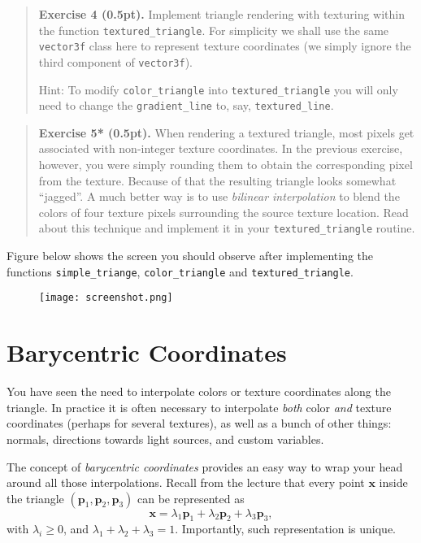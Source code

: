 \documentclass{article}
\newenvironment{exercise}[2]{\begin{verse}\textbf{Exercise #1 (#2pt).} }{
\end{verse}\medskip}
\newcommand{\bx}{\mathbf{x}}
\newcommand{\bp}{\mathbf{p}}
\begin{document}
\begin{exercise}{4}{0.5}
Implement triangle rendering with texturing within the function \verb#textured_triangle#. For simplicity we shall use the same \texttt{vector3f} class here to represent texture coordinates (we simply ignore the third component of \texttt{vector3f}).

Hint: To modify \verb#color_triangle# into \verb#textured_triangle# you will only need to change the \verb#gradient_line# to, say, \verb#textured_line#.
\end{exercise}

\begin{exercise}{5*}{0.5}
When rendering a textured triangle, most pixels get associated with non-integer texture coordinates. In the previous exercise, however, you were simply rounding them to obtain the corresponding pixel from the texture. Because of that the resulting triangle looks somewhat ``jagged''. A much better way is to use \emph{bilinear interpolation} to blend the colors of four texture pixels surrounding the source texture location. Read about this technique and implement it in your \verb#textured_triangle# routine.
\end{exercise}

Figure below shows the screen you should observe after implementing the functions \verb#simple_triange#, \verb#color_triangle# and \verb#textured_triangle#.

\begin{figure}[h!]
\centering
\texttt{[image: screenshot.png]}
\label{fig:screen}
\end{figure}

\section{Barycentric Coordinates}
You have seen the need to interpolate colors or texture coordinates along the triangle. In practice it is often necessary to interpolate \emph{both} color \emph{and} texture coordinates (perhaps for several textures), as well as a bunch of other things: normals, directions towards light sources, and custom variables.

The concept of \emph{barycentric coordinates} provides an easy way to wrap your head around all those interpolations. Recall from the lecture that every point $\bx$ inside the triangle $(\bp_1, \bp_2, \bp_3)$ can be represented as
$$
\bx = \lambda_1 \bp_1 + \lambda_2 \bp_2 + \lambda_3 \bp_3,
$$
with $\lambda_i \geq 0$, and $\lambda_1 + \lambda_2 + \lambda_3 = 1$. Importantly, such representation is unique.
\end{document}
